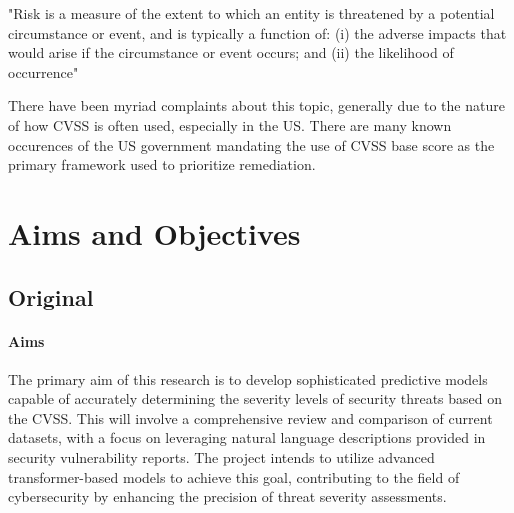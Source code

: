 \documentclass[12pt]{article}
\begin{document}
"Risk is a measure of the extent to which an entity is threatened by a potential circumstance or event, and is
typically a function of: (i) the adverse impacts that would arise if the circumstance or event occurs; and (ii) the
likelihood of occurrence"

There have been myriad complaints about this topic, generally due to the nature of how CVSS is often
used, especially in the US. There are many known occurences of the US government mandating the use
of CVSS base score as the primary framework used to prioritize remediation.


\printbibliography[title={References}]







\section{Aims and Objectives}


\subsection*{Original}

\paragraph{Aims}
The primary aim of this research is to develop sophisticated predictive models capable of accurately determining
the severity levels of security threats based on the CVSS. This will involve a comprehensive review and comparison
of current datasets, with a focus on leveraging natural language descriptions provided in security vulnerability reports.
The project intends to utilize advanced transformer-based models to achieve this goal, contributing to the field of
cybersecurity by enhancing the precision of threat severity assessments.
\end{document}
